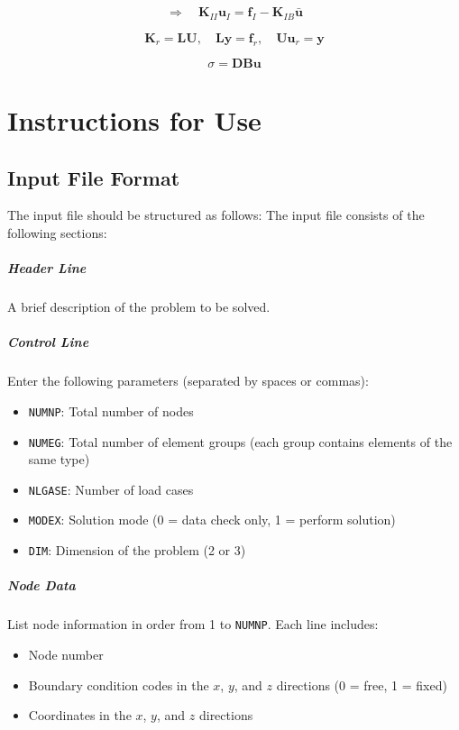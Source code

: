 \documentclass[a4paper,12pt]{report}
\begin{document}
\[
\Rightarrow \quad
\mathbf{K}_{II} \mathbf{u}_I = \mathbf{f}_I - \mathbf{K}_{IB} \bar{\mathbf{u}}
\]

\[
\mathbf{K}_r = \mathbf{L} \mathbf{U}, \quad 
\mathbf{L} \mathbf{y} = \mathbf{f}_r, \quad 
\mathbf{U} \mathbf{u}_r = \mathbf{y}
\]

\[
\sigma = \mathbf{D} \mathbf{B} \mathbf{u}
\]

\chapter{Instructions for Use}
\section{Input File Format}

The input file should be structured as follows:
The input file consists of the following sections:

\paragraph{Header Line}  
A brief description of the problem to be solved.

\paragraph{Control Line}  
Enter the following parameters (separated by spaces or commas):
\begin{itemize}
  \item \texttt{NUMNP}: Total number of nodes
  \item \texttt{NUMEG}: Total number of element groups (each group contains elements of the same type)
  \item \texttt{NLGASE}: Number of load cases
  \item \texttt{MODEX}: Solution mode (0 = data check only, 1 = perform solution)
  \item \texttt{DIM}: Dimension of the problem (2 or 3)
\end{itemize}

\paragraph{Node Data}  
List node information in order from 1 to \texttt{NUMNP}. Each line includes:
\begin{itemize}
  \item Node number
  \item Boundary condition codes in the $x$, $y$, and $z$ directions (0 = free, 1 = fixed)
  \item Coordinates in the $x$, $y$, and $z$ directions
\end{itemize}
\end{document}
